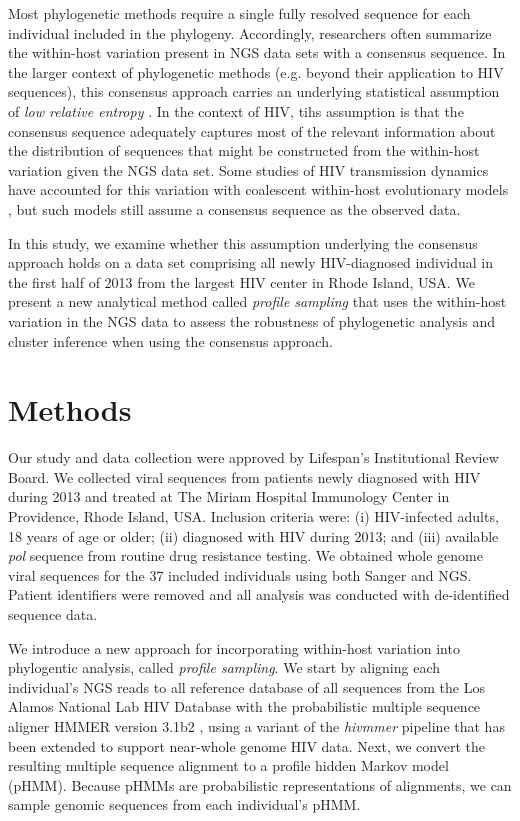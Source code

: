 \documentclass[letterpaper]{article}
\begin{document}
Most phylogenetic methods require a single fully resolved sequence for each individual included in the phylogeny. Accordingly, researchers often summarize the within-host variation present in NGS data sets with a consensus sequence. In the larger context of phylogenetic methods (e.g. beyond their application to HIV sequences), this consensus approach carries an underlying statistical assumption of \emph{low relative entropy} \parencite{guang}. In the context of HIV, tihs assumption is that the consensus sequence adequately captures most of the relevant information about the distribution of sequences that might be constructed from the within-host variation given the NGS data set. Some studies of HIV transmission dynamics have accounted for this variation with coalescent within-host evolutionary models \parencite{giardina, romero-severson}, but such models still assume a consensus sequence as the observed data.

In this study, we examine whether this assumption underlying the consensus approach holds on a data set comprising all newly HIV-diagnosed individual in the first half of 2013 from the largest HIV center in Rhode Island, USA. We present a new analytical method called \emph{profile sampling} that uses the within-host variation in the NGS data to assess the robustness of phylogenetic analysis and cluster inference when using the consensus approach.

\section*{Methods}

Our study and data collection were approved by Lifespan's Institutional Review Board. We collected viral sequences from patients newly diagnosed with HIV during 2013 and treated at The Miriam Hospital Immunology Center in Providence, Rhode Island, USA. Inclusion criteria were: (i) HIV-infected adults, 18 years of age or older; (ii) diagnosed with HIV during 2013; and (iii) available \emph{pol} sequence from routine drug resistance testing. We obtained whole genome viral sequences for the 37 included individuals using both Sanger and NGS. Patient identifiers were removed and all analysis was conducted with de-identified sequence data.

We introduce a new approach for incorporating within-host variation into phylogentic analysis, called \emph{profile sampling}. We start by aligning each individual's NGS reads to all reference database of all sequences from the Los Alamos National Lab HIV Database with the probabilistic multiple sequence aligner HMMER version 3.1b2 \parencite{eddy}, using a variant of the \emph{hivmmer} pipeline \parencite{howison} that has been extended to support near-whole genome HIV data. Next, we convert the resulting multiple sequence alignment to a profile hidden Markov model (pHMM). Because pHMMs are probabilistic representations of alignments, we can sample genomic sequences from each individual's pHMM.
\end{document}

